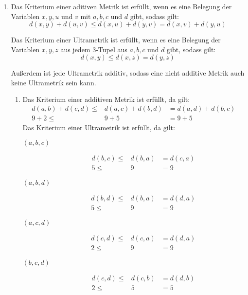 \documentclass{homework}
\date{Montag, dem 5. November 2012}
\author{Stefan Meißner (4279113) und Niels Hoppe (4356370)}
\begin{document}
\maketitle
\begin{enumerate} 

\begin{enumerate}
\item Das Kriterium einer aditiven Metrik ist erfüllt, wenn es eine Belegung der
Variablen $x, y, u$ und $v$ mit $a, b, c$ und $d$ gibt, sodass gilt:
$$d(x,y) + d(u,v) \leq d(x,u) + d(y,v) = d(x,v) + d(y,u)$$

Das Kriterium einer Ultrametrik ist erfüllt, wenn es eine Belegung der Variablen
$x, y, z$ aus jedem 3-Tupel aus $a, b, c$ und $d$ gibt, sodass gilt:
$$d(x,y) \leq d(x,z) = d(y,z)$$

Außerdem ist jede Ultrametrik additiv, sodass eine nicht additive Metrik auch
keine Ultrametrik sein kann.

\begin{enumerate}
\item Das Kriterium einer additiven Metrik ist erfüllt, da gilt:
\begin{eqnarray*}
d(a,b) + d(c,d) \leq & d(a,c) + d(b,d) & = d(a,d) + d(b,c)\\
9 + 2 \leq & 9 + 5 & = 9 + 5
\end{eqnarray*}
Das Kriterium einer Ultrametrik ist erfüllt, da gilt:
\begin{description}
\item[$(a,b,c)$] \begin{eqnarray*}
d(b,c) \leq & d(b,a) & = d(c,a)\\
5 \leq & 9 & = 9
\end{eqnarray*}
\item[$(a,b,d)$] \begin{eqnarray*}
d(b,d) \leq & d(b,a) & = d(d,a)\\
5 \leq & 9 & = 9
\end{eqnarray*}
\item[$(a,c,d)$] \begin{eqnarray*}
d(c,d) \leq & d(c,a) & = d(d,a)\\
2 \leq & 9 & = 9
\end{eqnarray*}
\item[$(b,c,d)$] \begin{eqnarray*}
d(c,d) \leq & d(c,b) & = d(d,b)\\
2 \leq & 5 & = 5
\end{eqnarray*}
\end{description}


\end{enumerate}
\end{enumerate}
\end{enumerate}
\end{document}
